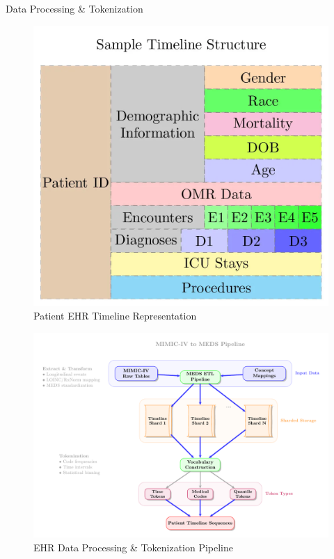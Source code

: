 \documentclass[final]{beamer}
\newlength{\colwidth}
\begin{document}
\begin{frame}[t]
\begin{columns}[t]
\begin{column}{\colwidth}
\begin{block}{Data Processing \& Tokenization}
      \begin{figure}
        \centering
        \includegraphics[width=0.6\colwidth]{figures/ehr_timeline.png}
        \caption{\large Patient EHR Timeline Representation}
        \label{fig:ehr_timeline}
      \end{figure}
  
  
      \begin{figure}
          \centering
          \includegraphics[width=1\linewidth]{figures/ehr_preprocessing_pipeline.pdf}
          \caption{\large EHR Data Processing \& Tokenization Pipeline}
          \label{fig:preprocessing_pipeline}
      \end{figure}
  

\end{block}
\end{column}
\end{columns}
\end{frame}
\end{document}
